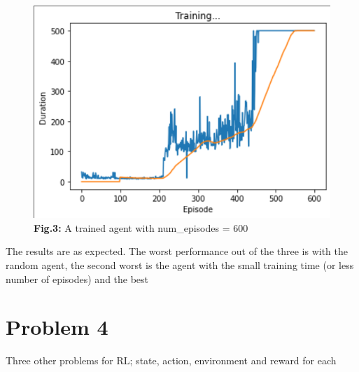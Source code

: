 \documentclass{article}
\numberwithin{equation}{section}
\numberwithin{equation}{section}
\begin{document}
\begin{figure}[H]
	\centering
	
	\includegraphics[width=\linewidth,cframe=blue 2.5pt 2.5pt]{agent600.png}
	\\	
	\vspace{0.1in}
	\textbf{Fig.3:} A trained agent with num\_episodes = 600
	\\
	\label{fig:Fig.3}
\end{figure}


The results are as expected. The worst performance out of the three is with the random agent, the second worst is the agent with the small training time (or less number of episodes) and the best 


\section{Problem 4}
Three other problems for RL; state, action, environment and reward for each

\end{document}

